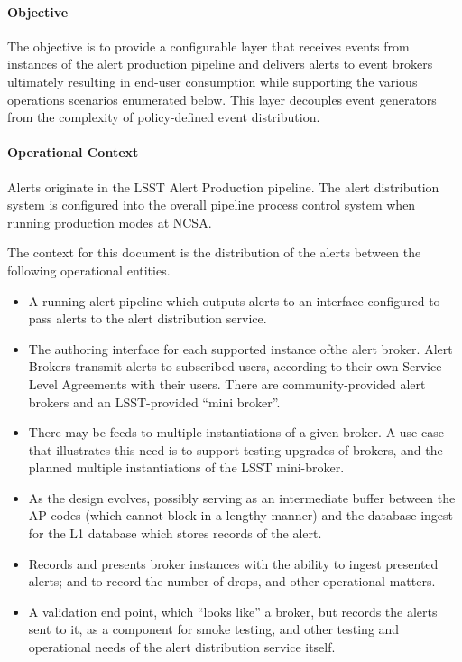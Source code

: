 \paragraph{Objective}

The objective is to provide a configurable layer that receives events from instances of the alert production pipeline and delivers alerts to event brokers ultimately resulting in end-user consumption while supporting the various operations scenarios enumerated below. This layer decouples event generators from the complexity of policy-defined event distribution. 

\paragraph{Operational Context}
Alerts originate in the LSST Alert Production pipeline. The alert distribution system is configured into the overall pipeline process control system when running production modes at NCSA.

The context for this document is the distribution of the alerts between the following operational entities. 

\begin{itemize}
\item A running alert pipeline which outputs alerts to an interface configured to pass alerts to the alert distribution service.

\item The authoring interface for each supported instance ofthe alert broker. Alert Brokers transmit alerts to subscribed users, according to their own Service Level Agreements with their users.  There are community-provided alert brokers and an LSST-provided “mini broker”.  

\item There may be feeds to multiple instantiations of a given broker. A use case that illustrates this need is to support testing upgrades of brokers, and the planned multiple instantiations of the LSST mini-broker.

\item As the design evolves, possibly serving as an intermediate buffer between the AP codes (which cannot block in a lengthy manner) and the database ingest for the L1 database which stores records of the alert.

\item Records and presents broker instances with the ability to ingest presented alerts; and to record the number of drops, and other operational matters.  

\item A validation end point, which “looks like” a broker, but records the alerts sent to it, as a component for smoke testing, and other testing and operational needs of the alert distribution service itself.

\end{itemize}

